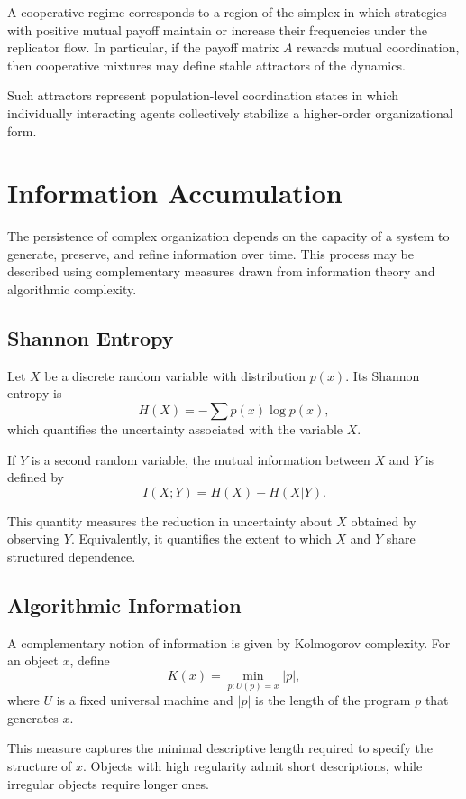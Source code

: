 \documentclass[12pt]{article}
\begin{document}
A cooperative regime corresponds to a region of the simplex in which strategies with positive mutual payoff maintain or increase their frequencies under the replicator flow. In particular, if the payoff matrix $A$ rewards mutual coordination, then cooperative mixtures may define stable attractors of the dynamics.

Such attractors represent population-level coordination states in which individually interacting agents collectively stabilize a higher-order organizational form.

\section{Information Accumulation}

The persistence of complex organization depends on the capacity of a system to generate, preserve, and refine information over time. This process may be described using complementary measures drawn from information theory and algorithmic complexity.

\subsection{Shannon Entropy}

Let $X$ be a discrete random variable with distribution $p(x)$. Its Shannon entropy is
\[
H(X) = - \sum p(x) \log p(x) ,
\]
which quantifies the uncertainty associated with the variable $X$.

If $Y$ is a second random variable, the mutual information between $X$ and $Y$ is defined by
\[
I(X;Y) = H(X) - H(X|Y) .
\]

This quantity measures the reduction in uncertainty about $X$ obtained by observing $Y$. Equivalently, it quantifies the extent to which $X$ and $Y$ share structured dependence.

\subsection{Algorithmic Information}

A complementary notion of information is given by Kolmogorov complexity. For an object $x$, define
\[
K(x) = \min_{p:U(p)=x} |p| ,
\]
where $U$ is a fixed universal machine and $|p|$ is the length of the program $p$ that generates $x$.

This measure captures the minimal descriptive length required to specify the structure of $x$. Objects with high regularity admit short descriptions, while irregular objects require longer ones.
\end{document}
